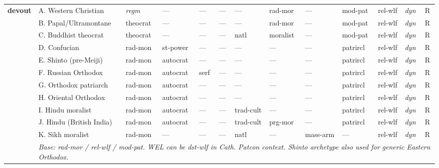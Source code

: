 \documentclass[a4paper]{article}
\newcommand{\nd}{---}
\newcommand{\reg}{\textit{regm}}
\newcommand{\minorrow}[2]{\rowcolor{minorRow} #1 & \multicolumn{12}{p{22cm}|}{\textit{#2}} \\}
\begin{document}
\begin{footnotesize}
\begin{longtable}{|p{1.8cm}|p{2.3cm}|p{1.55cm}|p{1.65cm}|p{1.65cm}|p{1.3cm}|p{1.5cm}|p{1.5cm}|p{1.5cm}|p{1.3cm}|p{1.45cm}|p{1.0cm}|p{2.65cm}|}
\multirow{12}{*}{\cellcolor{instHdr}\textbf{devout}} &
  A. Western Christian & \reg & \nd & \nd & \nd & \nd & rad-mor & \nd & mod-pat & rel-wlf & \textit{dyn} & R \\ \cline{2-13}
\cellcolor{instHdr} &
  B. Papal/Ultramontane & theocrat & \nd & \nd & \nd & \nd & rad-mor & \nd & mod-pat & rel-wlf & \textit{dyn} & R \\ \cline{2-13}
\cellcolor{instHdr} &
  C. Buddhist theocrat & theocrat & \nd & \nd & \nd & natl & moralist & \nd & mod-pat & rel-wlf & \textit{dyn} & R \\ \cline{2-13}
\cellcolor{instHdr} &
  D. Confucian & rad-mon & st-power & \nd & \nd & \nd & \nd & \nd & patrircl & rel-wlf & \textit{dyn} & R \\ \cline{2-13}
\cellcolor{instHdr} &
  E. Shinto (pre-Meiji) & rad-mon & autocrat & \nd & \nd & \nd & \nd & \nd & patrircl & rel-wlf & \textit{dyn} & R \\ \cline{2-13}
\cellcolor{instHdr} &
  F. Russian Orthodox & rad-mon & autocrat & serf & \nd & \nd & \nd & \nd & patrircl & rel-wlf & \textit{dyn} & R \\ \cline{2-13}
\cellcolor{instHdr} &
  G. Orthodox patriarch & rad-mon & autocrat & \nd & \nd & \nd & \nd & \nd & patrircl & rel-wlf & \textit{dyn} & R \\ \cline{2-13}
\cellcolor{instHdr} &
  H. Oriental Orthodox & rad-mon & autocrat & \nd & \nd & \nd & \nd & \nd & patrircl & rel-wlf & \textit{dyn} & R \\ \cline{2-13}
\cellcolor{instHdr} &
  I. Hindu moralist & rad-mon & autocrat & \nd & \nd & trad-cult & \nd & \nd & patrircl & rel-wlf & \textit{dyn} & R \\ \cline{2-13}
\cellcolor{instHdr} &
  J. Hindu (British India) & rad-mon & autocrat & \nd & \nd & trad-cult & prg-mor & \nd & patrircl & rel-wlf & \textit{dyn} & R \\ \cline{2-13}
\cellcolor{instHdr} &
  K. Sikh moralist & rad-mon & \nd & \nd & \nd & natl & \nd & mass-arm & \nd & rel-wlf & \textit{dyn} & R \\ \cline{2-13}
\minorrow{\cellcolor{instHdr}}{Base: rad-mor / rel-wlf / mod-pat. WEL can be dst-wlf in Cath. Patcon context. Shinto archetype also used for generic Eastern Orthodox.}
\hline


\end{longtable}
\end{footnotesize}
\end{document}
